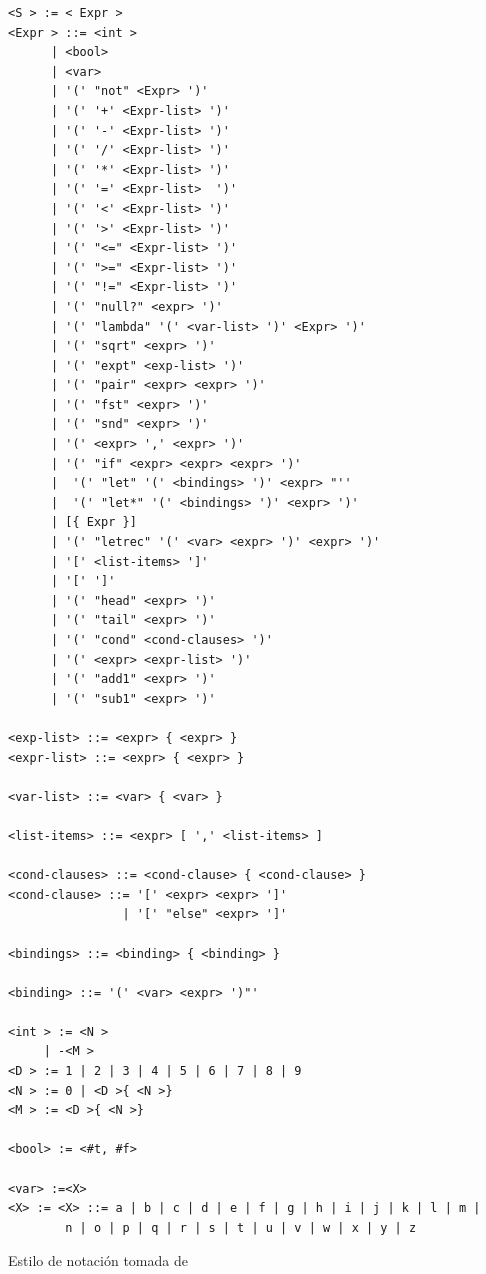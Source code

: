 \documentclass[a4paper,12pt]{article}
\begin{document}
\begin{tcolorbox}[title= Correción: Gramática en EBNF de LAMBDAE      MÓDULO A2, breakable]

\begin{center}
\begin{verbatim}
<S > := < Expr >
<Expr > ::= <int >
      | <bool> 
      | <var>
      | '(' "not" <Expr> ')'
      | '(' '+' <Expr-list> ')'
      | '(' '-' <Expr-list> ')'
      | '(' '/' <Expr-list> ')'
      | '(' '*' <Expr-list> ')'
      | '(' '=' <Expr-list>  ')'
      | '(' '<' <Expr-list> ')'
      | '(' '>' <Expr-list> ')'
      | '(' "<=" <Expr-list> ')' 
      | '(' ">=" <Expr-list> ')'
      | '(' "!=" <Expr-list> ')'
      | '(' "null?" <expr> ')'
      | '(' "lambda" '(' <var-list> ')' <Expr> ')'
      | '(' "sqrt" <expr> ')'
      | '(' "expt" <exp-list> ')'
      | '(' "pair" <expr> <expr> ')'
      | '(' "fst" <expr> ')'
      | '(' "snd" <expr> ')'
      | '(' <expr> ',' <expr> ')' 
      | '(' "if" <expr> <expr> <expr> ')'
      |  '(' "let" '(' <bindings> ')' <expr> "''
      |  '(' "let*" '(' <bindings> ')' <expr> ')'
      | [{ Expr }]
      | '(' "letrec" '(' <var> <expr> ')' <expr> ')'   
      | '[' <list-items> ']'
      | '[' ']'
      | '(' "head" <expr> ')'
      | '(' "tail" <expr> ')'
      | '(' "cond" <cond-clauses> ')'
      | '(' <expr> <expr-list> ')'                  
      | '(' "add1" <expr> ')'
      | '(' "sub1" <expr> ')'

<exp-list> ::= <expr> { <expr> }
<expr-list> ::= <expr> { <expr> }

<var-list> ::= <var> { <var> }

<list-items> ::= <expr> [ ',' <list-items> ]

<cond-clauses> ::= <cond-clause> { <cond-clause> }
<cond-clause> ::= '[' <expr> <expr> ']'
                | '[' "else" <expr> ']'

<bindings> ::= <binding> { <binding> }

<binding> ::= '(' <var> <expr> ')"'

<int > := <N >
     | -<M >
<D > := 1 | 2 | 3 | 4 | 5 | 6 | 7 | 8 | 9
<N > := 0 | <D >{ <N >}
<M > := <D >{ <N >}

<bool> := <#t, #f>

<var> :=<X>
<X> := <X> ::= a | b | c | d | e | f | g | h | i | j | k | l | m | 
        n | o | p | q | r | s | t | u | v | w | x | y | z
\end{verbatim}
\end{center}

Estilo de notación tomada de \cite{ISO14977,LambdaSpace2,LambdaSpace04}
\end{tcolorbox}
\end{document}
